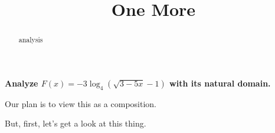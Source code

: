 \documentclass{ximera}
\title{One More}
\begin{document}
\begin{abstract}
analysis
\end{abstract}
\maketitle












\textbf{Analyze $F(x) = -3 \log_4(\sqrt{3 - 5x} - 1)$ with its natural domain. }







Our plan is to view this as a composition. 



But, first, let's get a look at this thing. 
\end{document}
